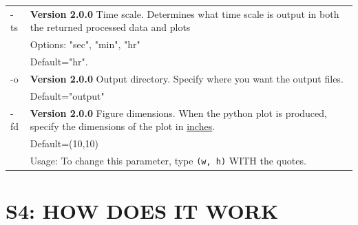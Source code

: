 \documentclass[12pt]{article}
\begin{document}
\begin{center}
\begin{xltabular}{\textwidth}{lX}
\hline
-ts & \textbf{Version 2.0.0} Time scale. Determines what time scale is output in both the returned processed data and plots\\
 & Options: "sec", "min", "hr"\\
 & Default="hr".\\
\hline
-o & \textbf{Version 2.0.0} Output directory. Specify where you want the output files.\\
 & Default="output"\\
\hline
-fd & \textbf{Version 2.0.0} Figure dimensions. When the python plot is produced, specify the dimensions of the plot in \uline{inches}.\\
 & Default=(10,10)\\
 & Usage: To change this parameter, type \texttt{(w, h)} WITH the quotes.\\
\end{xltabular}
\end{center}

\section*{S4: HOW DOES IT WORK}
\label{sec:orgef78a56}
\end{document}

